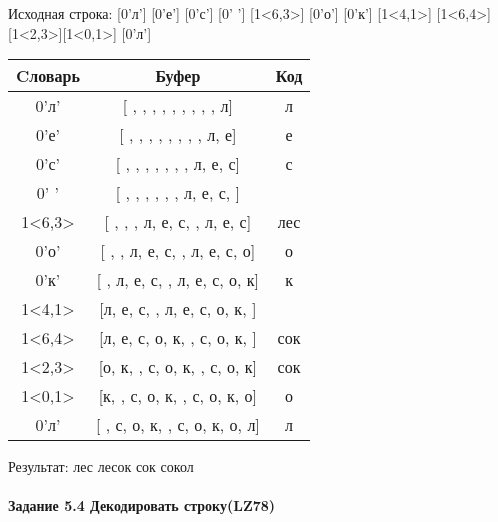\documentclass[a4paper, 12pt]{article}
\begin{document}
Исходная строка: [0'л'] [0'е'] [0'с'] [0' '] [1<6,3>] [0'о'] [0'к'] [1<4,1>] [1<6,4>] [1<2,3>][1<0,1>] [0'л']\\
\begin{table}[h!]
\centering
\begin{tabular}{|c|c|c|}
\hline
 Cловарь & Буфер & Код  \\ \hline
0'л' & [ ,  ,  ,  ,  ,  ,  ,  ,  , л] & л
\\ \hline
0'е' & [ ,  ,  ,  ,  ,  ,  ,  , л, е] & е
\\ \hline
0'с' & [ ,  ,  ,  ,  ,  ,  , л, е, с] & с
\\ \hline
0' ' & [ ,  ,  ,  ,  ,  , л, е, с,  ] &  
\\ \hline
1<6,3> & [ ,  ,  , л, е, с,  , л, е, с] & лес
\\ \hline
0'о' & [ ,  , л, е, с,  , л, е, с, о] & о
\\ \hline
0'к' & [ , л, е, с,  , л, е, с, о, к] & к
\\ \hline
1<4,1> & [л, е, с,  , л, е, с, о, к,  ] &  
\\ \hline
1<6,4> & [л, е, с, о, к,  , с, о, к,  ] & сок 
\\ \hline
1<2,3> & [о, к,  , с, о, к,  , с, о, к] & сок
\\ \hline
1<0,1> & [к,  , с, о, к,  , с, о, к, о] & о
\\ \hline
0'л' & [ , с, о, к,  , с, о, к, о, л] & л
\\ \hline
\end{tabular}
\end{table}

Результат: лес лесок сок сокол
\pagebreak
\paragraph{Задание 5.4 Декодировать строку(LZ78)\\}
\end{document}

